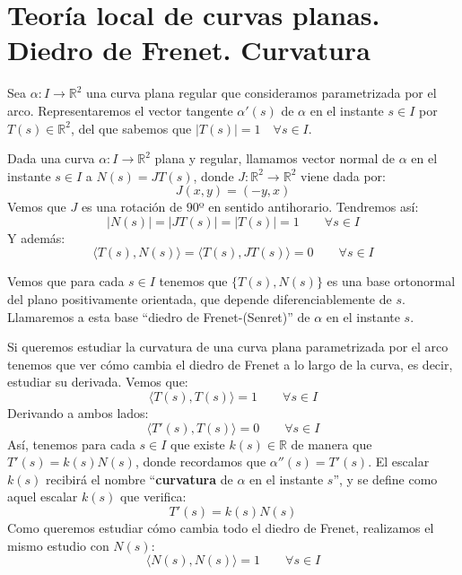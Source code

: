 \section{Teoría local de curvas planas. Diedro de Frenet. Curvatura}
\noindent
Sea $\alpha:I\to \mathbb{R}^2$ una curva plana regular que consideramos parametrizada por el arco. Representaremos el vector tangente $\alpha'(s)$ de $\alpha$ en el instante $s\in I$ por $T(s)\in \mathbb{R}^2$, del que sabemos que $|T(s)| = 1 \quad \forall s\in I$.

\begin{definicion}
    Dada una curva $\alpha:I\to \mathbb{R}^2$ plana y regular, llamamos vector normal de $\alpha$ en el instante $s\in I$ a $N(s) = JT(s)$, donde $J:\mathbb{R}^2\to \mathbb{R}^2$ viene dada por:
    \begin{equation*}
        J(x,y) = (-y,x)
    \end{equation*}
    Vemos que $J$ es una rotación de $90$º en sentido antihorario. Tendremos así:
    \begin{equation*}
        |N(s)| = |JT(s)| = |T(s)| = 1 \qquad \forall s\in I
    \end{equation*}
    Y además:
    \begin{equation*}
        \langle T(s),N(s) \rangle = \langle T(s),JT(s) \rangle  = 0 \qquad \forall s\in I
    \end{equation*}
\end{definicion}

\begin{observacion}
    Vemos que para cada $s\in I$ tenemos que $\{T(s),N(s)\}$ es una base ortonormal del plano positivamente orientada, que depende diferenciablemente de $s$. Llamaremos a esta base ``diedro de Frenet-(Senret)'' de $\alpha$ en el instante $s$.
\end{observacion}

\noindent
Si queremos estudiar la curvatura de una curva plana parametrizada por el arco tenemos que ver cómo cambia el diedro de Frenet a lo largo de la curva, es decir, estudiar su derivada. Vemos que:
\begin{equation*}
    \langle T(s),T(s) \rangle = 1 \qquad \forall s\in I
\end{equation*}
Derivando a ambos lados:
\begin{equation*}
    \langle T'(s),T(s) \rangle = 0 \qquad \forall s\in I
\end{equation*}
Así, tenemos para cada $s\in I$ que existe $k(s)\in \mathbb{R}$ de manera que $T'(s) = k(s) N(s)$, donde recordamos que $\alpha''(s) = T'(s)$. El escalar $k(s)$ recibirá el nombre ``\textbf{curvatura} de $\alpha$ en el instante $s$'', y se define como aquel escalar $k(s)$ que verifica:
\begin{equation*}
    \boxed{T'(s) = k(s)N(s)}
\end{equation*}
Como queremos estudiar cómo cambia todo el diedro de Frenet, realizamos el mismo estudio con $N(s)$:
\begin{equation*}
    \langle N(s),N(s) \rangle = 1 \qquad \forall s\in I
\end{equation*}

